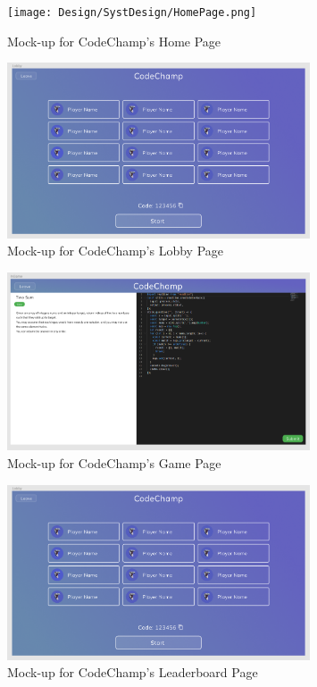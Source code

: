 \documentclass[12pt, titlepage]{article}
\begin{document}
\begin{figure}[H]
\centering
\texttt{[image: Design/SystDesign/HomePage.png]}
\caption{Mock-up for CodeChamp's Home Page}
\end{figure}

\begin{figure}[H]
\centering
\includegraphics[width=0.8\textwidth]{Design/SystDesign/LobbyPage.png}
\caption{Mock-up for CodeChamp's Lobby Page}
\end{figure}

\begin{figure}[H]
\centering
\includegraphics[width=0.8\textwidth]{Design/SystDesign/GamePage.png}
\caption{Mock-up for CodeChamp's Game Page}
\end{figure}

\begin{figure}[H]
\centering
\includegraphics[width=0.8\textwidth]{Design/SystDesign/LeaderboardPage.png}
\caption{Mock-up for CodeChamp's Leaderboard Page}
\end{figure}
\end{document}
